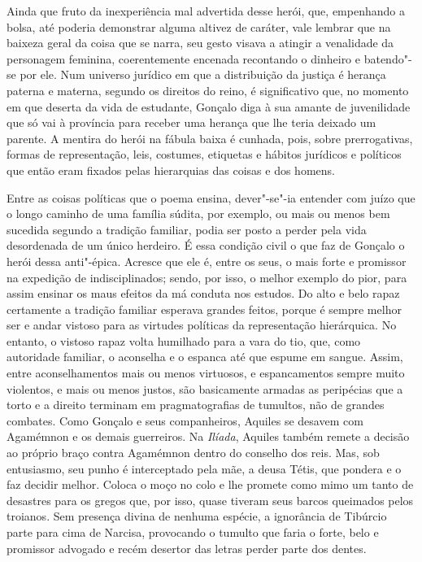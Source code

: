 Ainda que fruto da inexperiência mal advertida desse herói, que, empenhando a
bolsa, até poderia demonstrar alguma altivez de caráter, vale lembrar que na
baixeza geral da coisa que se narra, seu gesto visava a atingir a venalidade da
personagem feminina, coerentemente encenada recontando o dinheiro e batendo"-se
por ele.  Num universo jurídico em que a distribuição da justiça é herança
paterna e materna, segundo os direitos do reino, é significativo que, no momento
em que deserta da vida de estudante, Gonçalo diga à sua amante de juvenilidade
que só vai à província para receber uma herança que lhe teria deixado um
parente.  A mentira do herói na fábula baixa é cunhada, pois, sobre
prerrogativas, formas de representação, leis, costumes, etiquetas e hábitos
jurídicos e políticos que então eram fixados pelas hierarquias das coisas e dos
homens.

Entre as coisas políticas que o poema ensina, dever"-se"-ia entender com juízo que
o longo caminho de uma família súdita, por exemplo, ou mais ou menos bem
sucedida segundo a tradição familiar, podia ser posto a perder pela vida
desordenada de um único herdeiro.  É essa condição civil o que faz de Gonçalo o
herói dessa anti"-épica. Acresce que ele é, entre os seus, o mais forte e
promissor na expedição de indisciplinados; sendo, por isso, o melhor exemplo do
pior, para assim ensinar os maus efeitos da má conduta nos estudos. Do alto e
belo rapaz certamente a tradição familiar esperava grandes feitos, porque é
sempre melhor ser e andar vistoso para as virtudes políticas da representação
hierárquica. No entanto, o vistoso rapaz volta humilhado para a vara do tio,
que, como autoridade familiar, o aconselha e o espanca até que espume em sangue.
Assim, entre aconselhamentos mais ou menos virtuosos, e espancamentos sempre
muito violentos, e mais ou menos justos, são basicamente armadas as peripécias
que a torto e a direito terminam em pragmatografias de tumultos, não de grandes
combates. Como Gonçalo e seus companheiros,  Aquiles se desavem com Agamémnon e
os demais guerreiros. Na \textit{Ilíada}, Aquiles também remete a decisão ao
próprio braço  contra Agamémnon dentro do conselho dos reis. Mas, sob
entusiasmo, seu punho é interceptado pela mãe, a deusa Tétis, que pondera e o
faz decidir melhor. Coloca o moço no colo e lhe promete como mimo um tanto de
desastres para os gregos que, por isso, quase tiveram seus barcos queimados
pelos troianos. Sem presença divina de nenhuma espécie, a ignorância de Tibúrcio
parte para cima de Narcisa, provocando o tumulto que faria o forte, belo
e promissor advogado e recém desertor das letras perder parte dos dentes.

